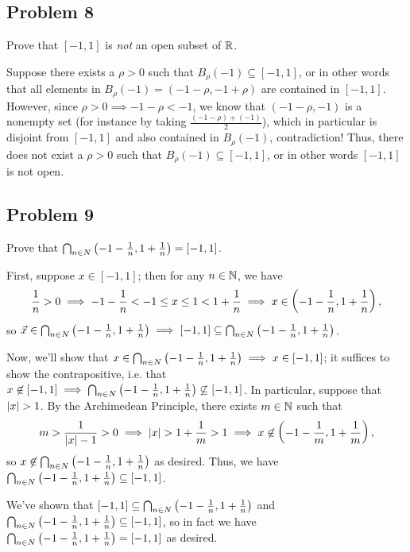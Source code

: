 \documentclass[main.tex]{subfiles}
\begin{document}
\subsection{Problem 8}
\begin{claim}
    Prove that $[-1,1]$ is \textit{not} an open subset of $\mathbb R$.
\end{claim}

\begin{soln}
    Suppose there exists a $\rho > 0$ such that $B_\rho(-1) \subseteq [-1, 1]$, or in other words that all elements in $B_\rho(-1) = (-1 - \rho, -1 + \rho)$ are contained in $[-1, 1]$. However, since $\rho > 0\implies -1 - \rho < -1$, we know that $(-1 - \rho, -1)$ is a nonempty set (for instance by taking $\frac{(-1 - \rho) + (-1)}{2}$), which in particular is disjoint from $[-1, 1]$ and also contained in $B_\rho(-1)$, contradiction! Thus, there does not exist a $\rho > 0$ such that $B_\rho(-1)\subseteq [-1, 1]$, or in other words $[-1, 1]$ is not open.
\end{soln}
\eject

\subsection{Problem 9}
\begin{claim}
    Prove that $\bigcap_{n\in N}\left( -1 - \frac{1}{n},1 + \frac{1}{n} \right) = [-1,1]$.
\end{claim}

\begin{soln}
    First, suppose $x\in [-1, 1]$; then for any $n\in \mathbb N$, we have 
    \[\frac{1}{n} > 0 \implies -1 - \frac{1}{n} < -1 \le x \le 1 < 1 + \frac{1}{n}\implies x\in \left( -1 - \frac{1}{n},1 + \frac{1}{n} \right),\]
    so $\vec{x}\in \bigcap_{n\in N}\left( -1 - \frac{1}{n},1 + \frac{1}{n} \right)\implies [-1, 1]\subseteq \bigcap_{n\in N}\left( -1 - \frac{1}{n},1 + \frac{1}{n} \right)$.

    Now, we'll show that $x\in \bigcap_{n\in N}\left( -1 - \frac{1}{n},1 + \frac{1}{n} \right)\implies x\in [-1, 1]$; it suffices to show the contrapositive, i.e. that $x\not\in[-1, 1]\implies \bigcap_{n\in N}\left( -1 - \frac{1}{n}, 1 + \frac{1}{n} \right)\not\subseteq [-1, 1]$. In particular, suppose that $\left\lvert x \right\rvert > 1$. By the Archimedean Principle, there exists $m\in \mathbb N$ such that 
    \[m > \frac{1}{\left\lvert x \right\rvert - 1} > 0\implies \left\lvert x \right\rvert > 1 + \frac{1}{m} > 1\implies x\not\in \left( -1 - \frac{1}{m}, 1 + \frac{1}{m} \right),\]
    so $x\not\in \bigcap_{n\in N}\left( -1 - \frac{1}{n},1 + \frac{1}{n} \right)$ as desired. Thus, we have $\bigcap_{n\in N}\left( -1 - \frac{1}{n},1 + \frac{1}{n} \right)\subseteq [-1, 1]$.

    We've shown that $[-1, 1]\subseteq \bigcap_{n\in N}\left( -1 - \frac{1}{n},1 + \frac{1}{n} \right)$ and $\bigcap_{n\in N}\left( -1 - \frac{1}{n},1 + \frac{1}{n} \right)\subseteq [-1, 1]$, so in fact we have $\bigcap_{n\in N}\left( -1 - \frac{1}{n},1 + \frac{1}{n} \right) = [-1, 1]$ as desired.
\end{soln}
\eject
\end{document}

